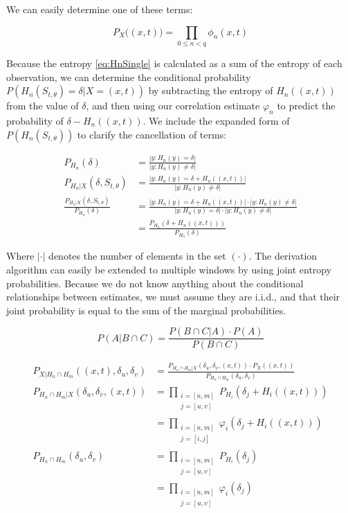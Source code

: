 \documentclass[10pt]{article}
\begin{document}
We can easily determine one of these terms:

\begin{equation} P_X \big( (x,t) \big) = \prod_{0 \le n < q} \phi_n(x,t) \end{equation}

Because the entropy \ref{eq:HnSingle} is calculated as a sum of the entropy of each observation, we can determine the conditional probability \( P \left( H_n(S_{t,\theta}) = \delta | X = (x,t) \right) \) by subtracting the entropy of \(H_n((x,t)) \) from the value of \(\delta \), and then using our correlation estimate \(\varphi_n \) to predict the probability of \(\delta - H_n((x,t)) \).  We include the expanded form of \(P( H_n(S_{t,\theta}) ) \) to clarify the cancellation of terms:

\begin{align*}
P_{H_n} \left( \delta \right) &= \frac{ | y : H_n(y) = \delta | }{ | y : H_n(y) \ne \delta | } \\
P_{H_n |X} \left( \delta, S_{t,\theta} \right) &= \frac{ | y : H_n(y) = \delta + H_n \left( (x,t) \right) | }{ | y : H_n (y) \ne \delta | } \\
\frac{ P_{H_n |X} \left( \delta, S_{t,\theta} \right) }{ P_{H_n}( \delta ) } &= \frac{ | y : H_n(y) = \delta + H_n \left( (x,t) \right) | \cdot | y : H_n(y) \ne \delta | }
{ | y : H_n(y) = \delta | \cdot | y : H_n(y) \ne \delta | } \\
&= \frac{ P_{H_n} \left( \delta + H_n \left( (x,t) \right) \right) }{ P_{H_n} \left( \delta \right) } 
\end{align*}

Where \( | \cdot | \) denotes the number of elements in the set \( (\cdot) \).  The derivation algorithm can easily be extended to multiple windows by using joint entropy probabilities.  Because we do not know anything about the conditional relationships between estimates, we must assume they are i.i.d., and that their joint probability is equal to the sum of the marginal probabilities.


\[ P(A|B \cap C) = \frac{ P(B \cap C|A) \cdot P(A) }{ P(B \cap C) } \]

\begin{align}
P_{X|H_n \cap H_m} \left( (x,t), \delta_u, \delta_v \right) &=
	\frac { P_{H_n \cap H_m | X} \left( \delta_u, \delta_v, (x,t) \right) \cdot P_X \left( (x,t) \right) } { P_{H_n \cap H_m} \left( \delta_u, \delta_v \right) } \nonumber \\
P_{H_n \cap H_m | X} \left( \delta_u, \delta_v, (x,t) \right) &= 
	\prod_{\substack{i=[n,m] \\ j=[u,v]}} P_{H_i} \left( \delta_j + H_i((x,t)) \right) \nonumber 
\\
&= \prod_{\substack{i=[n,m]\\j=[i,j]}} \varphi_i \left( \delta_j + H_i((x,t)) \right) \\
P_{H_n \cap H_m} \left( \delta_u, \delta_v \right) &= 
	\prod_{\substack{i=[n,m]\\j=[u,v]}} P_{H_i} \left( \delta_j \right) \nonumber 
\\
&= \prod_{\substack{i=[n,m]\\j=[u,v]}} \varphi_i( \delta_j )
\end{align}
\end{document}

